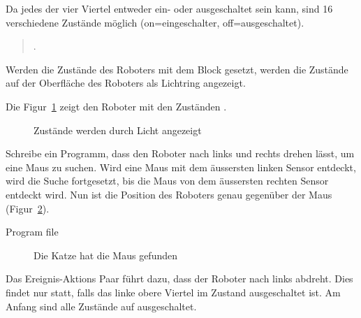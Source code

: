 Da jedes der vier Viertel entweder ein- oder ausgeschaltet sein kann, sind 16 verschiedene Zustände möglich (on=eingeschalter, off=ausgeschaltet).

\begin{quote}
.
\end{quote}

Werden die Zustände des Roboters mit dem Block  gesetzt, werden die Zustände auf der Oberfläche des Roboters als Lichtring angezeigt.

Die Figur~\ref{fig.state-leds} zeigt den Roboter mit den Zuständen .


\begin{figure}
\begin{center}
\caption{Zustände werden durch Licht angezeigt}
\label{fig.state-leds}
\end{center}
\end{figure}


Schreibe ein Programm, dass den Roboter nach links und rechts drehen lässt, um eine Maus zu suchen. Wird eine Maus mit dem äussersten linken Sensor entdeckt, wird die Suche fortgesetzt, bis die Maus von dem äussersten rechten Sensor entdeckt wird. Nun ist die Position des Roboters genau gegenüber der Maus (Figur~\ref{fig.cat-mouse}).

{\raggedleft \hfill Program file }


\begin{figure}
\begin{center}
\caption{Die Katze hat die Maus gefunden}
\label{fig.cat-mouse}
\end{center}
\end{figure}

Das Ereignis-Aktions Paar  führt dazu, dass der Roboter nach links abdreht. Dies findet nur statt, falls das linke obere Viertel im Zustand ausgeschaltet ist. Am Anfang sind alle Zustände auf ausgeschaltet.



